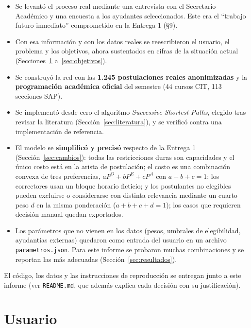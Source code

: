\documentclass{article}
\begin{document}
\begin{itemize}
    \item Se levantó el proceso real mediante una entrevista con el Secretario Académico y una encuesta a los ayudantes seleccionados. Este era el ``trabajo futuro inmediato'' comprometido en la Entrega 1 (§9).
    \item Con esa información y con los datos reales se reescribieron el usuario, el problema y los objetivos, ahora sustentados en cifras de la situación actual (Secciones~\ref{sec:usuario} a~\ref{sec:objetivos}).
    \item Se construyó la red con las \textbf{1.245 postulaciones reales anonimizadas} y la \textbf{programación académica oficial} del semestre (44 cursos CIT, 113 secciones SAP).
    \item Se implementó desde cero el algoritmo \textit{Successive Shortest Paths}, elegido tras revisar la literatura (Sección~\ref{sec:literatura}), y se verificó contra una implementación de referencia.
    \item El modelo se \textbf{simplificó y precisó} respecto de la Entrega 1 (Sección~\ref{sec:cambios}): todas las restricciones duras son capacidades y el único costo está en la arista de postulación; el costo es una combinación convexa de tres preferencias, $aP^O + bP^E + cP^A$ con $a + b + c = 1$; los correctores usan un bloque horario ficticio; y los postulantes no elegibles pueden excluirse o considerarse con distinta relevancia mediante un cuarto peso $d$ en la misma ponderación ($a + b + c + d = 1$); los casos que requieren decisión manual quedan exportados.
    \item Los parámetros que no vienen en los datos (pesos, umbrales de elegibilidad, ayudantías externas) quedaron como entrada del usuario en un archivo \texttt{parametros.json}. Para este informe se probaron muchas combinaciones y se reportan las más adecuadas (Sección~\ref{sec:resultados}).
\end{itemize}

El código, los datos y las instrucciones de reproducción se entregan junto a este informe (ver \texttt{README.md}, que además explica cada decisión con su justificación).

\section{Usuario}
\label{sec:usuario}
\label{sec:levantamiento}
\end{document}
